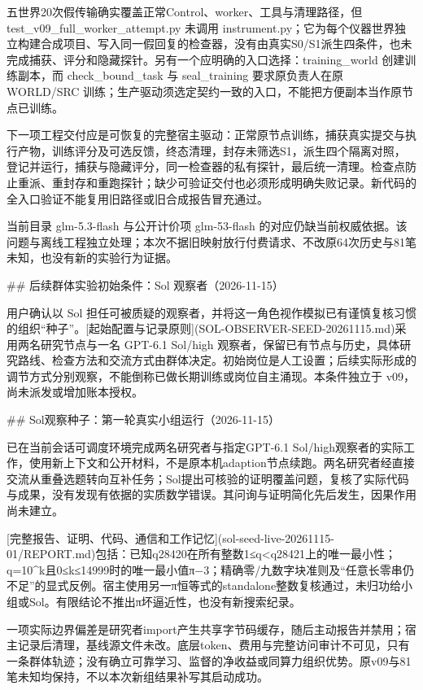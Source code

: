 五世界20次假传输确实覆盖正常Control、worker、工具与清理路径，但 test_v09_full_worker_attempt.py 未调用 instrument.py；它为每个仪器世界独立构建合成项目、写入同一假回复的检查器，没有由真实S0/S1派生四条件，也未完成捕获、评分和隐藏探针。另有一个应明确的入口选择：training_world 创建训练副本，而 check_bound_task 与 seal_training 要求原负责人在原 WORLD/SRC 训练；生产驱动须选定契约一致的入口，不能把方便副本当作原节点已训练。

下一项工程交付应是可恢复的完整宿主驱动：正常原节点训练，捕获真实提交与执行产物，训练评分及可选反馈，终态清理，封存未筛选S1，派生四个隔离对照，登记并运行，捕获与隐藏评分，同一检查器的私有探针，最后统一清理。检查点防止重派、重封存和重跑探针；缺少可验证交付也必须形成明确失败记录。新代码的全入口验证不能复用旧路径或旧合成报告冒充通过。

当前目录 glm-5.3-flash 与公开计价项 glm-53-flash 的对应仍缺当前权威依据。该问题与离线工程独立处理；本次不据旧映射放行付费请求、不改原64次历史与81笔未知，也没有新的实验行为证据。


## 后续群体实验初始条件：Sol 观察者（2026-11-15）

用户确认以 Sol 担任可被质疑的观察者，并将这一角色视作模拟已有谨慎复核习惯的组织“种子”。[起始配置与记录原则](SOL-OBSERVER-SEED-20261115.md)采用两名研究节点与一名 GPT-6.1 Sol/high 观察者，保留已有节点与历史，具体研究路线、检查方法和交流方式由群体决定。初始岗位是人工设置；后续实际形成的调节方式分别观察，不能倒称已做长期训练或岗位自主涌现。本条件独立于 v09，尚未派发或增加账本授权。


## Sol观察种子：第一轮真实小组运行（2026-11-15）

已在当前会话可调度环境完成两名研究者与指定GPT-6.1 Sol/high观察者的实际工作，使用新上下文和公开材料，不是原本机adaption节点续跑。两名研究者经直接交流从重叠选题转向互补任务；Sol提出可核验的证明覆盖问题，复核了实际代码与成果，没有发现有依据的实质数学错误。其问询与证明简化先后发生，因果作用尚未建立。

[完整报告、证明、代码、通信和工作记忆](sol-seed-live-20261115-01/REPORT.md)包括：已知q28420在所有整数1≤q<q28421上的唯一最小性；q=10^k且0≤k≤14999时的唯一最小值π−3；精确零/九数字块准则及“任意长零串仍不足”的显式反例。宿主使用另一π恒等式的standalone整数复核通过，未归功给小组或Sol。有限结论不推出π坏逼近性，也没有新搜索纪录。

一项实际边界偏差是研究者import产生共享字节码缓存，随后主动报告并禁用；宿主记录后清理，基线源文件未改。底层token、费用与完整访问审计不可见，只有一条群体轨迹；没有确立可靠学习、监督的净收益或同算力组织优势。原v09与81笔未知均保持，不以本次新组结果补写其启动成功。


